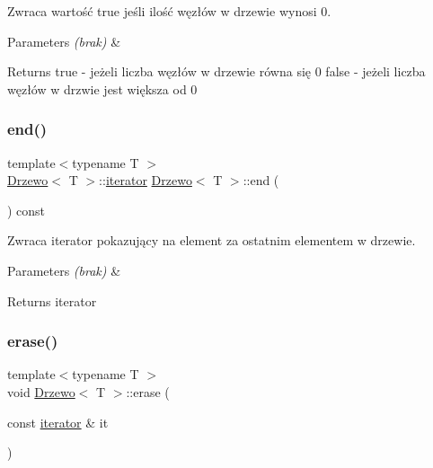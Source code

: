 Zwraca wartość \textquotesingle{}true\textquotesingle{} jeśli ilość węzłów w drzewie wynosi 0.


\begin{DoxyParams}{Parameters}
{\em (brak)} & \\
\hline
\end{DoxyParams}
\begin{DoxyReturn}{Returns}
true -\/ jeżeli liczba węzłów w drzewie równa się 0 false -\/ jeżeli liczba węzłów w drzwie jest większa od 0 
\end{DoxyReturn}
\mbox{\label{class_drzewo_aea36f65c42299dd029a38fbf9ed346fb}} 
\subsubsection{\texorpdfstring{end()}{end()}}
{\footnotesize\ttfamily template$<$typename T $>$ \\
\hyperlink{class_drzewo}{Drzewo}$<$ T $>$\+::\hyperlink{class_drzewo_1_1iterator}{iterator} \hyperlink{class_drzewo}{Drzewo}$<$ T $>$\+::end (\begin{DoxyParamCaption}{ }\end{DoxyParamCaption}) const\hspace{0.3cm}{\ttfamily [inline]}}

Zwraca iterator pokazujący na element za ostatnim elementem w drzewie.


\begin{DoxyParams}{Parameters}
{\em (brak)} & \\
\hline
\end{DoxyParams}
\begin{DoxyReturn}{Returns}
iterator 
\end{DoxyReturn}
\mbox{\label{class_drzewo_a338ae0e9b48ee6d513b9f99c81da3d4b}} 
\subsubsection{\texorpdfstring{erase()}{erase()}}
{\footnotesize\ttfamily template$<$typename T $>$ \\
void \hyperlink{class_drzewo}{Drzewo}$<$ T $>$\+::erase (\begin{DoxyParamCaption}\item[{const \hyperlink{class_drzewo_1_1iterator}{iterator} \&}]{it }\end{DoxyParamCaption})}

